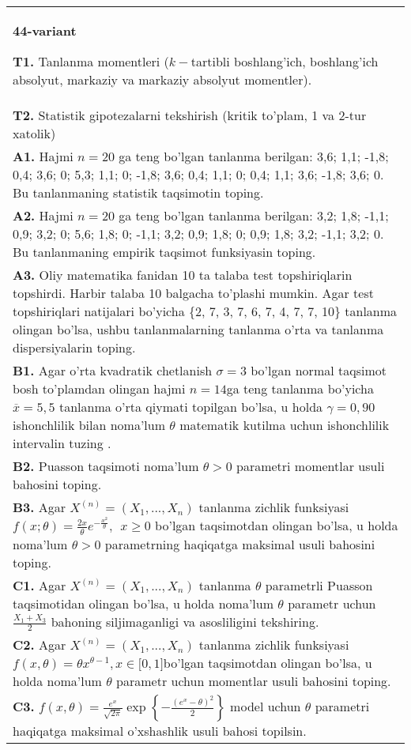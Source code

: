 \documentclass{article}
\begin{document}
\begin{tabular}{m{17cm}}
\textbf{44-variant}
\newline

\textbf{T1.} 
Tanlanma momentleri (\(k -\)tartibli boshlang'ich, boshlang'ich absolyut, markaziy va markaziy absolyut momentler).
\\
\textbf{T2.} 
Statistik gipotezalarni tekshirish (kritik to'plam, 1 va 2-tur xatolik)
\\
\textbf{A1.} 
Hajmi \(n = 20\) ga teng bo'lgan tanlanma berilgan: 3,6; 1,1; -1,8; 0,4; 3,6; 0; 5,3; 1,1; 0; -1,8; 3,6; 0,4; 1,1; 0; 0,4; 1,1; 3,6; -1,8; 3,6; 0. Bu tanlanmaning statistik taqsimotin toping.
\\
\textbf{A2.} 
Hajmi \(n = 20\) ga teng bo'lgan tanlanma berilgan: 3,2; 1,8; -1,1; 0,9; 3,2; 0; 5,6; 1,8; 0; -1,1; 3,2; 0,9; 1,8; 0; 0,9; 1,8; 3,2; -1,1; 3,2; 0. Bu tanlanmaning empirik taqsimot funksiyasin toping.
\\
\textbf{A3.} 
Oliy matematika fanidan 10 ta talaba test topshiriqlarin topshirdi. Harbir talaba 10 balgacha to'plashi mumkin. Agar test topshiriqlari natijalari bo'yicha \{2, 7, 3, 7, 6, 7, 4, 7, 7, 10\} tanlanma olingan bo'lsa, ushbu tanlanmalarning tanlanma o'rta va tanlanma dispersiyalarin toping.
\\
\textbf{B1.} 
Agar o'rta kvadratik chetlanish \(\sigma = 3\) bo'lgan normal taqsimot bosh to'plamdan olingan hajmi \(n = 14\)ga teng tanlanma bo'yicha \(\overline{x} = 5,5\) tanlanma o'rta qiymati topilgan bo'lsa, u holda \(\gamma = 0,90\) ishonchlilik bilan noma'lum \(\theta\) matematik kutilma uchun ishonchlilik intervalin tuzing .
\\
\textbf{B2.} 
Puasson taqsimoti noma'lum \(\theta > 0\) parametri momentlar usuli bahosini toping.
\\
\textbf{B3.} 
Agar \(X^{(n)} = \left( X_{1},...,X_{n} \right)\) tanlanma zichlik funksiyasi \(f(x;\theta) = \frac{2x}{\theta}e^{- \frac{x^{2}}{\theta}},\ \ x \geq 0\) bo'lgan taqsimotdan olingan bo'lsa, u holda noma'lum \(\theta > 0\) parametrning haqiqatga maksimal usuli bahosini toping.
\\
\textbf{C1.} 
Agar \(X^{(n)} = \left( X_{1},...,X_{n} \right)\) tanlanma \(\theta\) parametrli Puasson taqsimotidan olingan bo'lsa, u holda noma'lum \(\theta\) parametr uchun \(\frac{X_{1} + X_{3}}{2}\) bahoning siljimaganligi va asosliligini tekshiring.
\\
\textbf{C2.} 
Agar \(X^{(n)} = \left( X_{1},...,X_{n} \right)\) tanlanma zichlik funksiyasi\(f(x,\theta) = \theta x^{\theta - 1},x \in \lbrack 0,1\rbrack\)bo'lgan taqsimotdan olingan bo'lsa, u holda noma'lum \(\theta\) parametr uchun momentlar usuli bahosini toping.
\\
\textbf{C3.} 
\(f(x,\theta) = \frac{e^{x}}{\sqrt{2\pi}}\exp\left\{ - \frac{\left( e^{x} - \theta \right)^{2}}{2} \right\}\) model uchun \(\theta\) parametri haqiqatga maksimal o'xshashlik usuli bahosi topilsin.
\\

\end{tabular}
\vspace{1cm}
\end{document}
